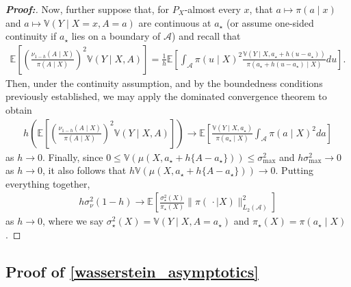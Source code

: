 \documentclass[11pt,twoside]{article}
\theoremstyle{definition}
\theoremstyle{remark}
\begin{document}
\begin{proof}[\textbf{Proof:}]
Now, further suppose that, for $P_X$-almost every $x$, that $a \mapsto \pi(a \! \mid \! x)$ and $a \mapsto \mathbb{V}(Y \mid X = x, A = a)$ are continuous at $a_\star$ (or assume one-sided continuity if $a_\star$ lies on a boundary of $\mathcal{A}$) and recall that
\begin{align*}
    \mathbb{E}\left[\left(\frac{\nu_{1-h}(A \! \mid \! X)}{\pi(A \! \mid \! X)}\right)^2 \mathbb{V}(Y \mid X, A)  \right] = \frac{1}{h} \mathbb{E}\left[\int_\mathcal{A}\pi(u \! \mid \! X)^2 \frac{\mathbb{V}(Y \mid X, a_\star + h(u - a_\star))}{\pi(a_\star + h(u - a_\star) \! \mid \! X)}  du \right].
\end{align*}
Then, under the continuity assumption, and by the boundedness conditions previously established, we may apply the dominated convergence theorem to obtain
\begin{align*}
     h \left(\mathbb{E}\left[\left(\frac{\nu_{1-h}(A \! \mid \! X)}{\pi(A \! \mid \! X)}\right)^2 \mathbb{V}(Y \mid X, A)  \right] \right) \longrightarrow \mathbb{E}\left[\frac{\mathbb{V}(Y \mid X, a_\star)}{\pi(a_\star \mid X)} \int_\mathcal{A} \pi(a \mid X)^2 da \right]
\end{align*}
as $h \to 0$. Finally, since $0 \leq \mathbb{V}(\mu(X, a_\star + h\{A - a_\star\})) \leq \sigma^2_{\max}$ and $h \sigma^2_{\max} \longrightarrow 0$ as $h \to 0$, it also follows that $h \mathbb{V}(\mu(X, a_\star + h\{A - a_\star\})) \longrightarrow 0$. Putting everything together,
\begin{align*}
    h \sigma^2_\nu(1-h) \longrightarrow \mathbb{E}\left[\frac{\sigma^2_\star(X)}{\pi_\star(X)} \| \pi( \, \cdot \mid X) \|^2_{L_2(\mathcal{A})} \right]
\end{align*}
as $h \to 0$, where we say $\sigma^2_\star(X) = \mathbb{V}(Y \mid X, A = a_\star)$ and $\pi_{\star}(X) = \pi(a_\star \mid X)$.

\end{proof}




\subsection{Proof of \cref{wasserstein_asymptotics}} \label{wasserstein_asymptotics_proof}
\end{document}
